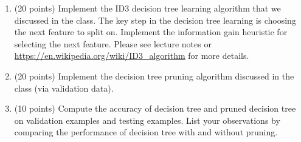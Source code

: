 \documentclass[11pt]{article}
\begin{document}
\begin{enumerate}
\begin{enumerate}
\item (20 points) Implement the ID3 decision tree learning
algorithm that we discussed in the class. The key step in the
decision tree learning is choosing the next feature to split on.
Implement the information gain heuristic for selecting the next
feature. Please see lecture notes or
\url{https://en.wikipedia.org/wiki/ID3_algorithm} for more
details.

\item (20 points) Implement the decision tree pruning algorithm
discussed in the class (via validation data).

\item (10 points) Compute the accuracy of decision tree and
pruned decision tree on validation examples and testing examples.
List your observations by comparing the performance of decision
tree with and without pruning.

\end{enumerate}


\end{enumerate}
\end{document}
